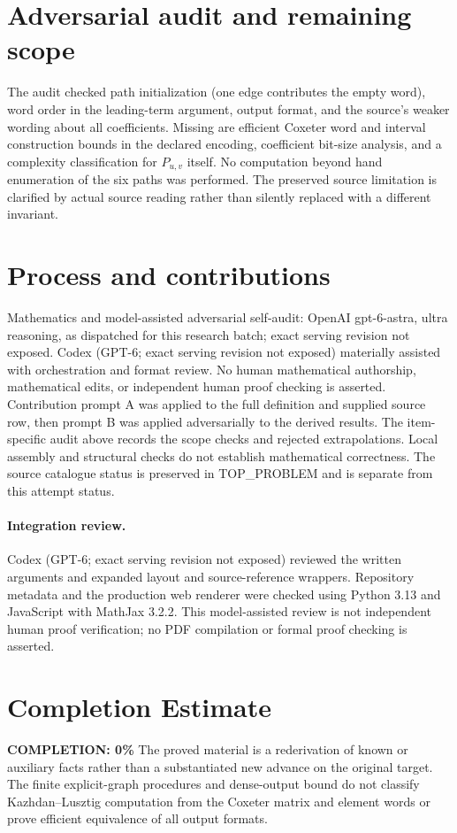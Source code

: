 \documentclass[11pt]{article}
\begin{document}
\section{Adversarial audit and remaining scope}
The audit checked path initialization (one edge contributes the empty word),
word order in the leading-term argument, output format, and the source's
weaker wording about all coefficients. Missing are efficient Coxeter word and
interval construction bounds in the declared encoding, coefficient bit-size
analysis, and a complexity classification for $P_{u,v}$ itself. No computation
beyond hand enumeration of the six paths was performed. The preserved source
limitation is clarified by actual source reading rather than silently replaced
with a different invariant.

\section{Process and contributions}
Mathematics and model-assisted adversarial self-audit: OpenAI gpt-6-astra, ultra reasoning, as dispatched for this research batch; exact serving revision not exposed. Codex (GPT-6; exact serving revision not exposed) materially assisted with orchestration and format review. No human mathematical authorship, mathematical edits, or independent human proof checking is asserted.
Contribution prompt A was applied to the full definition and supplied source row, then prompt B was applied adversarially to the derived results. The item-specific audit above records the scope checks and rejected extrapolations. Local assembly and structural checks do not establish mathematical correctness. The source catalogue status is preserved in TOP\_PROBLEM and is separate from this attempt status.
\paragraph{Integration review.} Codex (GPT-6; exact serving revision not exposed) reviewed the written arguments and expanded layout and source-reference wrappers. Repository metadata and the production web renderer were checked using Python 3.13 and JavaScript with MathJax 3.2.2. This model-assisted review is not independent human proof verification; no PDF compilation or formal proof checking is asserted.

\section{Completion Estimate}
\noindent\textbf{COMPLETION: 0\%}
The proved material is a rederivation of known or auxiliary facts rather than a substantiated new advance on the original target. The finite explicit-graph procedures and dense-output bound do not classify Kazhdan--Lusztig computation from the Coxeter matrix and element words or prove efficient equivalence of all output formats.
\end{document}
